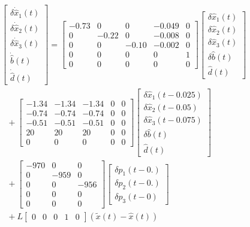 \documentclass[a4paper, 10pt, onecolumn]{article}
\begin{document}
{\scriptsize
\begin{equation}
\label{observer-exemple}
\begin{aligned}
&\left[\begin{array}{c}\delta\dot{\hat{x}}_1(t)\\\delta\dot{\hat{x}}_2(t) \\\delta \dot{\hat{x}}_3(t)\\ \dot{\hat{b}}(t)\\ \dot{\hat{d}}(t)\end{array}\right]=\left[\begin{array}{ccccc}
-0.73\!&0\!&0\!&-0.049&0\\
0\!&-0.22\!&0\!&-0.008&0\\
0\!&0\!&-0.10\!&-0.002&0\\
0\!&0\!&0\!&0&1\\
0&0&0&0&0
\end{array}\right]\left[\begin{array}{c}\delta \hat{x}_1(t)\\\delta \hat{x}_2(t)\\\delta \hat{x}_3(t)\\ \delta \hat{b}(t)\\\hat{d}(t)\end{array}\right]\\&~~~+
\left[\begin{array}{ccccc}
-1.34&-1.34&-1.34&0&0\\
-0.74&-0.74&-0.74&0&0\\
-0.51&-0.51&-0.51&0&0\\
20&20&20&0&0\\
0&0&0&0&0
\end{array}\right]\left[\begin{array}{c}\delta \hat{x}_1(t-0.025)\\\delta \hat{x}_2(t-0.05)\\\delta \hat{x}_3(t-0.075)\\ \delta \hat{b}(t)\\ \hat{d}(t)\end{array}\right]\\&~~~+\left[\begin{array}{ccc}
-970&0&0\\
0&-959&0\\
0&0&-956\\
0&0&0\\
0&0&0
\end{array}\right]\left[\begin{array}{c}\delta p_1(t-0.)\\ \delta p_2(t-0.) \\ \delta p_3(t-0)\end{array}\right]\\
&~~~+L\left[\begin{array}{ccccc}0&0&0&1&0\end{array}\right]\left(\tilde{x}(t)-\hat{x}(t)\right)
\end{aligned}
\end{equation}}
\end{document}
